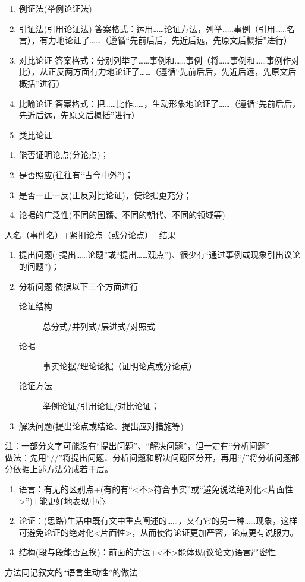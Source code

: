 \begin{enumerate}
\item 例证法(举例论证法)
\item 引证法(引用论证法)
答案格式：运用\ldots{}\ldots{}论证方法，列举\ldots{}\ldots{}事例（引用\ldots{}\ldots{}名言），有力地论证了\ldots{}\ldots{}（遵循``先前后后，先近后远，先原文后概括''进行）
\item 对比论证
答案格式：分别列举了\ldots{}\ldots{}事例和\ldots{}\ldots{}事例（将\ldots{}\ldots{}事例和\ldots{}\ldots{}事例作对比），从正反两方面有力地论证了\ldots{}\ldots{}（遵循``先前后后，先近后远，先原文后概括''进行）
\item 比喻论证
答案格式：把\ldots{}\ldots{}比作\ldots{}\ldots{}，生动形象地论证了\ldots{}\ldots{}（遵循``先前后后，先近后远，先原文后概括''进行）
\item 类比论证
\end{enumerate}
\begin{enumerate}
\item 能否证明论点(分论点)；
\item 是否照应(往往有``古今中外'')；
\item 是否一正一反(正反对比论证)，使论据更充分；
\item 论据的广泛性(不同的国籍、不同的朝代、不同的领域等)
\end{enumerate}
  人名（事件名）+紧扣论点（或分论点）+结果
\begin{enumerate}
\item 提出问题(``提出\ldots{}\ldots{}论题''或``提出\ldots{}\ldots{}观点'')、很少有``通过事例或现象引出议论的问题'')；
\item 分析问题
依据以下三个方面进行
\begin{description}
\item[论证结构]总分式/并列式/层进式/对照式
\item[论据]事实论据/理论论据（证明论点或分论点）
\item[论证方法]举例论证/引用论证/对比论证；
\end{description}
\item 解决问题(提出论点或结论、提出应对措施等)
\end{enumerate}
注：一部分文字可能没有``提出问题''、``解决问题''，但一定有``分析问题''
\\做法：先用``//''将提出问题、分析问题和解决问题区分开，再用``/''将分析问题部分依据上述方法分成若干层。
\begin{enumerate}
\item 语言：有无的区别点+(有的有``<不>符合事实''或``避免说法绝对化<片面性>'')+能更好地表现中心
\item 论证：(思路)生活中既有文中重点阐述的\ldots{}\ldots{}，又有它的另一种\ldots{}\ldots{}现象，这样可避免论证的绝对化<片面性>，从而使得论证更加严密，论点更有说服力。
\item 结构(段与段能否互换)：前面的方法+<不>能体现(议论文)语言严密性
\end{enumerate}
  方法同记叙文的``语言生动性''的做法
